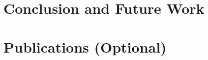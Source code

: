 \documentclass[a4paper]{ustthesis}
\begin{document}
\chapter{Conclusion and Future Work}
\label{chp_conclusion}

\newpage

\appendix
\chapter{Publications (Optional)}
\label{appx:publications}

\newpage



\end{document}
